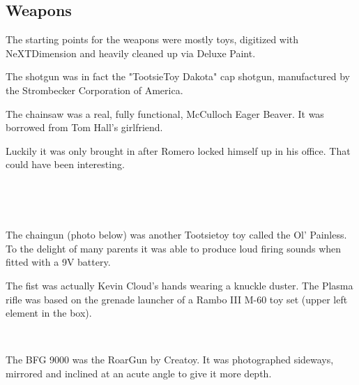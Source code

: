 \subsection{Weapons}
The starting points for the weapons were mostly toys, digitized with NeXTDimension and heavily cleaned up via Deluxe Paint.\\
\par
 The shotgun was in fact the "TootsieToy Dakota" cap shotgun, manufactured by the Strombecker Corporation of America.\\
\par
{}
\par
The chainsaw was a real, fully functional, McCulloch Eager Beaver. It was borrowed from Tom Hall's girlfriend.\\
\par
{}
\par
Luckily it was only brought in after Romero locked himself up in his office. That could have been interesting.\\
\par
{}\\
\par





\\
\par

The chaingun (photo below) was another Tootsietoy toy called the Ol' Painless. To the delight of many parents it was able to produce loud firing sounds when fitted with a 9V battery.

\par
{}

\vspace{-5mm}
The fist was actually Kevin Cloud's hands wearing a knuckle duster. The Plasma rifle was based on the grenade launcher of a Rambo III M-60 toy set (upper left element in the box).
\par
{}\\
\par
The BFG 9000 was the RoarGun by Creatoy. It was photographed sideways, mirrored and inclined at an acute angle to give it more depth.\\
\par
{}
\pagebreak


